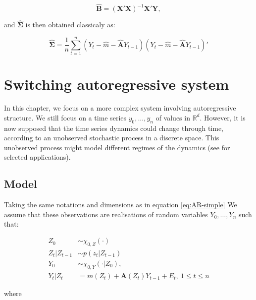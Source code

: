 \documentclass[]{book}
\begin{document}
\begin{equation}
\hat{\mathbf{B}} = \left(\mathbf{X'X}\right)^{-1}\mathbf{X}'\mathbf{Y}, \label{eq:AR-simple-B-hat}
\end{equation}

and \(\hat{\mathbf{\Sigma}}\) is then obtained classicaly as:

\begin{equation}
\hat{\mathbf{\Sigma}} = \frac{1}{n} \sum_{t = 1}^n \left(Y_t - \hat{m} - \hat{\mathbf{A}} Y_{t - 1}\right) \left(Y_t - \hat{m} - \hat{\mathbf{A}} Y_{t - 1}\right)' \label{eq:AR-simple-Sigma-hat}
\end{equation}

\chapter{Switching autoregressive
system}\label{switching-autoregressive-system}

In this chapter, we focus on a more complex system involving
autoregressive structure. We still focus on a time series
\(y_0, \dots, y_n\) of values in \(\mathbb{R}^d\). However, it is now
supposed that the time series dynamics could change through time,
according to an unobserved stochastic process in a discrete space. This
unobserved process might model different regimes of the dynamics (see
\citet{rabiner1989tutorial} for selected applications).

\section{Model}\label{model}

Taking the same notations and dimensions as in equation
\eqref{eq:AR-simple} We assume that these observations are realisations of
random variables \(Y_0,\dots, Y_n\) such that:

\begin{align*}
Z_0 &\sim \chi_{0, Z}(\cdot)\\
Z_t \vert Z_{t - 1} &\sim p(z_t \vert Z_{t - 1}) \\
Y_0 &\sim \chi_{0, Y}(\cdot \vert Z_0), \\
Y_t \vert Z_t &= m(Z_t) + \mathbf{A}(Z_t)Y_{t -1} + E_t,~1\leq t \leq n 
\end{align*}

where
\end{document}
